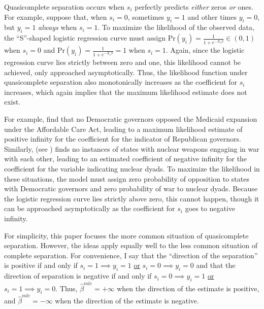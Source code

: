 \documentclass[12pt]{article}
\begin{document}
Quasicomplete separation occurs when $s_i$ perfectly predicts \emph{either} zeros \emph{or} ones. For example, suppose that,  when $s_i = 0$, sometimes $y_i = 1$ and other times $y_i = 0$, but $y_i = 1$ \emph{always} when $s_i = 1$. To maximize the likelihood of the observed data, the ``S''-shaped logistic regression curve must assign $\text{Pr}(y_i) = \frac{1}{1 + e^{-X_i\beta}} \in (0, 1)$ when $s_i  = 0$ and $\text{Pr}(y_i) = \frac{1}{1 + e^{-X_i\beta}} = 1$ when $s_i = 1$. Again, since the logistic regression curve lies strictly between zero and one, this likelihood cannot be achieved, only approached asymptotically. Thus, the likelihood function under quasicomplete separation also monotonically increases as the coefficient for $s_i$ increases, which again implies that the maximum likelihood estimate does not exist.

For example, \cite{BarrilleauxRainey2014} find that no Democratic governors opposed the Medicaid expansion under the Affordable Care Act, leading to a maximum likelihood estimate of positive infinity for the coefficient for the indicator of Republican governors. Similarly, \cite{Rauchhaus2009} (see \citealt{BellMiller2014}) finds no instances of states with nuclear weapons engaging in war with each other, leading to an estimated coefficient of negative infinity for the coefficient for the variable indicating nuclear dyads. To maximize the likelihood in these situations, the model must assign zero probability of opposition to states with Democratic governors and zero probability of war to nuclear dyads. Because the logistic regression curve lies strictly above zero, this cannot happen, though it can be approached asymptotically as the coefficient for $s_i$ goes to negative infinity. 

For simplicity, this paper focuses the more common situation of quasicomplete separation. However, the ideas apply equally well to the less common situation of complete separation.  For convenience, I say that the ``direction of the separation'' is positive if and only if $s_i = 1 \implies y_i = 1$ \underline{or} $s_i = 0 \implies y_i = 0$ and that the direction of separation is negative if and only if $s_i = 0 \implies y_i = 1$ \underline{or} $s_i = 1 \implies y_i = 0$. Thus, $\hat{\beta}^{mle} = +\infty$ when the direction of the estimate is positive, and $\hat{\beta}^{mle} = -\infty$ when the direction of the estimate is negative.

\end{document}
